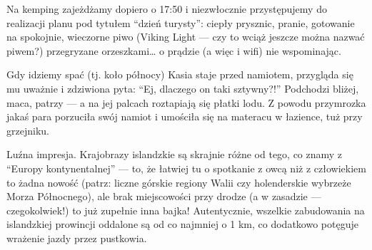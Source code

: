 
Na kemping zajeżdżamy dopiero o 17:50 i niezwłocznie przystępujemy do realizacji planu pod tytułem “dzień turysty”: ciepły prysznic, pranie, gotowanie na spokojnie, wieczorne piwo (Viking Light --- czy to wciąż jeszcze można nazwać piwem?) przegryzane orzeszkami… o prądzie (a więc i wifi) nie wspominając.

Gdy idziemy spać (tj. koło północy) Kasia staje przed namiotem, przygląda się mu uważnie i zdziwiona pyta: “Ej, dlaczego on taki sztywny?!” Podchodzi bliżej, maca, patrzy --- a na jej palcach roztapiają się płatki lodu. Z powodu przymrozka jakaś para porzuciła swój namiot i umościła się na materacu  w łazience, tuż przy grzejniku.


Luźna impresja. Krajobrazy islandzkie są skrajnie różne od tego, co znamy z “Europy kontynentalnej” --- to, że łatwiej tu o spotkanie z owcą niż z człowiekiem to żadna nowość (patrz: liczne górskie regiony Walii czy holenderskie wybrzeże Morza Północnego), ale brak miejscowości przy drodze (a w zasadzie --- czegokolwiek!) to już zupełnie inna bajka! Autentycznie, wszelkie zabudowania na islandzkiej prowincji oddalone są od  co najmniej o 1 km, co dodatkowo potęguje wrażenie jazdy przez pustkowia.


